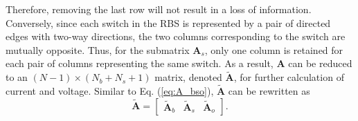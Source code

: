 \documentclass{article}
\providecommand{\DIFadd}[1]{{\protect\color{blue}\uwave{#1}}} %
\providecommand{\DIFaddbegin}{} %
\providecommand{\DIFaddend}{} %
\newcommand{\DIFaddincludegraphics}[2][]{{\color{blue}\fbox{\DIFOincludegraphics[#1]{#2}}}} %
\DeclareRobustCommand{\DIFaddbegin}{\DIFOaddbegin \let\includegraphics\DIFaddincludegraphics} %
\DeclareRobustCommand{\DIFaddend}{\DIFOaddend \let\includegraphics\DIFOincludegraphics} %
\begin{document}
Therefore, removing the last row will not result in a loss of information. 
Conversely, since each switch in the RBS is represented by a pair of directed edges with two-way directions, the two columns corresponding to the switch are mutually opposite.
Thus, for the submatrix $\bm{A}_s$, only one column is retained for each pair of columns representing the same switch.
As a result, $\bm{A}$ can be reduced to an $(N-1)\times(N_b+N_s+1)$ matrix, denoted $\bm{\tilde{A}}$, for further calculation of \DIFaddbegin \DIFadd{the }\DIFaddend current and voltage.
Similar to Eq. (\ref{eq:A_bso}), $\bm{\tilde{A}}$ can be rewritten as
\begin{equation}\label{eq:A_bso_tilde}
    \bm{\tilde{A}} =
    \begin{bmatrix}
        \bm{\tilde{A}}_b & \bm{\tilde{A}}_s & \bm{\tilde{A}}_o
    \end{bmatrix}.
\end{equation}
\end{document}
